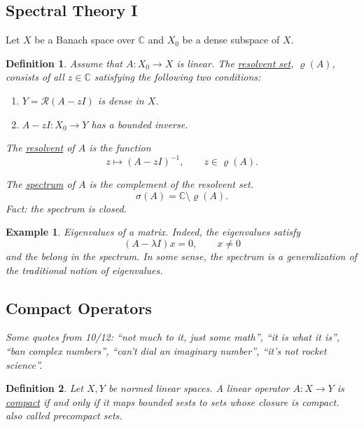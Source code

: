 \documentclass[letterpaper,twoside,11pt]{article}
\theoremstyle{mystyle}
\newtheorem{definition}{Definition}[section]
\newtheorem*{ex}{Example}
\newcommand{\C}{{\mathbb C}}
\newcommand{\cg}{\color{gray}}
\newcommand{\cbk}{\color{black}}
\begin{document}
\newpage \subsection{Spectral Theory I}

Let $X$ be a Banach space over $\C$ and $X_0$ be a dense subspace of $X$. 

\begin{definition}
Assume that $A: X_0 \to X$ is linear. The \underline{resolvent set}, $\varrho(A)$, consists of all $z\in \C$ satisfying the following two conditions: 
\begin{enumerate}
\item $Y = \mathcal R(A-zI)$ is dense in $X$. 
\item $A-zI:X_0 \to Y$ has a bounded inverse. 
\end{enumerate}

The \underline{resolvent} of $A$ is the function 
\[z\mapsto (A-zI)^{-1}, \qquad z\in \varrho(A).\]

The \underline{spectrum} of $A$ is the complement of the resolvent set. 
\[\sigma(A) = \C\setminus \varrho(A).\]
Fact: the spectrum is closed. 

\end{definition}

\begin{ex}
Eigenvalues of a matrix. Indeed, the eigenvalues satisfy 
\[(A-\lambda I)x = 0, \qquad x \neq 0\]
and the belong in the spectrum. In some sense, the spectrum is a generalization of the traditional notion of eigenvalues. 
\end{ex}
















\newpage \subsection{Compact Operators}

\cg \textit{Some quotes from 10/12: ``not much to it, just some math'', ``it is what it is'', ``ban complex numbers'', ``can't dial an imaginary number'', ``it's not rocket science''.} \cbk 

\begin{definition}
  Let $X,Y$ be normed linear spaces. A linear operator $A: X\to Y$ is \underline{compact} if and only if it maps bounded sests to sets whose closure is compact. \cg also called \textit{precompact} sets. \cbk 
\end{definition}
\end{document}
